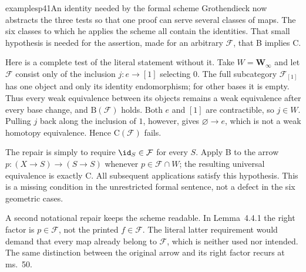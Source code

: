 \begin{dcomment}{examples}{p41}{An identity needed by the formal scheme}
Grothendieck now abstracts the three tests so that one proof can serve several classes of maps. The six classes to which he applies the scheme all contain the identities. That small hypothesis is needed for the assertion, made for an arbitrary $\mathcal F$, that B implies C.

Here is a complete test of the literal statement without it. Take $W=\mathbf W_\infty$ and let $\mathcal F$ consist only of the inclusion $j:e\to[1]$ selecting $0$. The full subcategory $\mathcal F_{[1]}$ has one object and only its identity endomorphism; for other bases it is empty. Thus every weak equivalence between its objects remains a weak equivalence after every base change, and $\mathrm B(\mathcal F)$ holds. Both $e$ and $[1]$ are contractible, so $j\in W$. Pulling $j$ back along the inclusion of $1$, however, gives $\varnothing\to e$, which is not a weak homotopy equivalence. Hence $\mathrm C(\mathcal F)$ fails.

The repair is simply to require $\id_S\in\mathcal F$ for every $S$. Apply B to the arrow $p:(X\to S)\to(S\to S)$ whenever $p\in\mathcal F\cap W$; the resulting universal equivalence is exactly C. All subsequent applications satisfy this hypothesis. This is a missing condition in the unrestricted formal sentence, not a defect in the six geometric cases.

A second notational repair keeps the scheme readable. In Lemma~4.4.1 the right factor is $p\in\mathcal F$, not the printed $f\in\mathcal F$. The literal latter requirement would demand that every map already belong to $\mathcal F$, which is neither used nor intended. The same distinction between the original arrow and its right factor recurs at ms.~50.
\end{dcomment}

